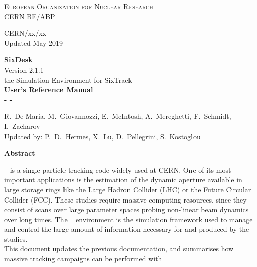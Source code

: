 \begin{titlepage}
\begin{center}\normalsize\scshape
    European Organization for Nuclear Research \\
    CERN BE/ABP
\end{center}
\vspace*{2mm}
\begin{flushright}
    CERN/xx/xx \\
    Updated May 2019
\end{flushright}
\begin{center}\Huge
    \textbf{SixDesk} \\
    \LARGE Version 2.1.1 \\
    \vspace*{8mm} the Simulation Environment for SixTrack\\
    \vspace*{8mm}\textbf{User's Reference Manual}\\
    \vspace*{8mm}\textbf{- \whichSixTrack{} -}
\end{center}
\begin{center}
    \vspace*{2mm}
  R.~De Maria, M.~Giovannozzi, E.~McIntosh, A.~Mereghetti, F.~Schmidt,
  I.~Zacharov \\
    \vspace*{2mm}Updated by:
    P.~D.~Hermes, X.~Lu, D.~Pellegrini, S.~Kostoglou
\end{center}
\begin{center}\large
    \vspace*{10mm}\textbf{Abstract} \\
\end{center}
\SIXTRACK{}~\cite{SixTrack_user_manual,SixPub,sixtrackWeb}
is a single particle tracking code widely used at CERN. One of its
most important applications is the estimation of the dynamic aperture available
in large storage rings like the Large Hadron Collider (LHC) or the Future
Circular Collider (FCC). These studies require massive computing resources,
since they consist of scans over large parameter spaces probing non-linear beam
dynamics over long times.
The \SIXDESK{}~\cite{SixDesk_original,SixDesk_updated} environment is the
simulation framework used to manage and control the large amount of
information necessary for and produced by the studies. \\
This document updates the previous documentation, and summarises how massive
tracking campaigns can be performed with \SIXTRACK{}

\end{titlepage}
